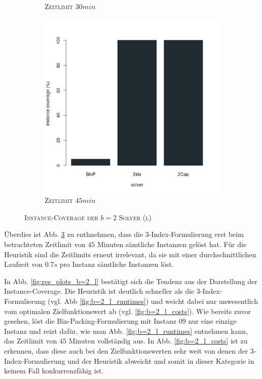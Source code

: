 \begin{figure}[H]
\begin{subfigure}[b]{0.3\textwidth}
\caption{\textsc{Zeitlimit} $30min$}
\label{fig:instance_cov_b=2_l_b}
\end{subfigure}
\hfill
\begin{subfigure}[b]{0.3\textwidth}
\centering
\includegraphics[width=1.2\textwidth]{img/solver_instance_coverage_b=2_l_2700s.png}
\caption{\textsc{Zeitlimit} $45min$}
\label{fig:instance_cov_b=2_l_c}
\end{subfigure}

\caption{\textsc{Instance-Coverage der $b=2$ Solver (l)}}
\label{fig:instance_cov_b=2_l}
\end{figure}

Überdies ist Abb. \ref{fig:instance_cov_b=2_l} zu enthnehmen, dass die 3-Index-Formulierung erst beim betrachteten
Zeitlimit von $45$ Minuten sämtliche Instanzen gelöst hat. Für die Heuristik sind die Zeitlimits erneut irrelevant,
da sie mit einer durchschnittlichen Laufzeit von $0.7s$ pro Instanz sämtliche Instanzen löst.

\pagebreak

In Abb. \ref{fig:res_plots_b=2_l} bestätigt sich die Tendenz aus der Darstellung der Instance-Coverage.
Die Heuristik ist deutlich schneller als die 3-Index-Formulierung (vgl. Abb \ref{fig:b=2_l_runtimes}) und weicht dabei nur
unwesentlich vom optimalen Zielfunktionswert ab (vgl. \ref{fig:b=2_l_costs}). Wie bereits zuvor gesehen, löst
die Bin-Packing-Formulierung mit Instanz $09$ nur eine einzige Instanz und reizt dafür, wie man Abb. \ref{fig:b=2_l_runtimes}
entnehmen kann, das Zeitlimit von $45$ Minuten vollständig aus. In Abb. \ref{fig:b=2_l_costs} ist zu erkennen, dass diese auch bei den
Zielfunktionswerten sehr weit von denen der 3-Index-Formulierung und der Heuristik abweicht und somit in dieser Kategorie in keinem Fall
konkurrenzfähig ist.

